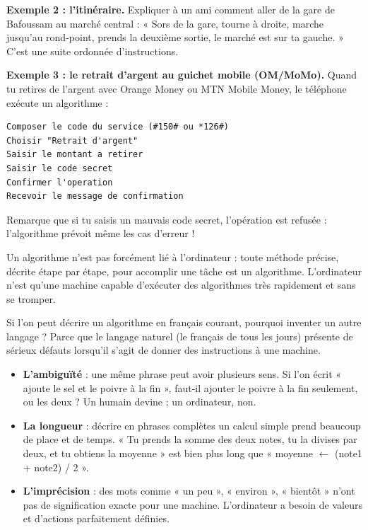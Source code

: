 \documentclass[11pt]{article}
\newcounter{popsec}
\newcounter{popsub}
\newcommand{\courssub}[1]{%
  \stepcounter{popsub}%
  \par\vspace{9pt}\noindent{\popxbold\fontsize{11.5}{13}\selectfont\color{popink}{\color{poporange}\thepopsec.\thepopsub}\hspace{6pt}#1}\par\nopagebreak\vspace{4pt}
}
\begin{document}
\textbf{Exemple 2 : l'itinéraire.} Expliquer à un ami comment aller de la gare de Bafoussam au marché central : « Sors de la gare, tourne à droite, marche jusqu'au rond-point, prends la deuxième sortie, le marché est sur ta gauche. » C'est une suite ordonnée d'instructions.

\textbf{Exemple 3 : le retrait d'argent au guichet mobile (OM/MoMo).} Quand tu retires de l'argent avec Orange Money ou MTN Mobile Money, le téléphone exécute un algorithme :

\begin{lstlisting}
Composer le code du service (#150# ou *126#)
Choisir "Retrait d'argent"
Saisir le montant a retirer
Saisir le code secret
Confirmer l'operation
Recevoir le message de confirmation
\end{lstlisting}

Remarque que si tu saisis un mauvais code secret, l'opération est refusée : l'algorithme prévoit même les cas d'erreur !

\begin{aretenir}[L'essentiel]
Un algorithme n'est pas forcément lié à l'ordinateur : toute méthode précise, décrite étape par étape, pour accomplir une tâche est un algorithme. L'ordinateur n'est qu'une machine capable d'exécuter des algorithmes très rapidement et sans se tromper.
\end{aretenir}

\courssub{Les limites du langage naturel}

Si l'on peut décrire un algorithme en français courant, pourquoi inventer un autre langage ? Parce que le langage naturel (le français de tous les jours) présente de sérieux défauts lorsqu'il s'agit de donner des instructions à une machine.

\begin{itemize}
\item \textbf{L'ambiguïté} : une même phrase peut avoir plusieurs sens. Si l'on écrit « ajoute le sel et le poivre à la fin », faut-il ajouter le poivre à la fin seulement, ou les deux ? Un humain devine ; un ordinateur, non.
\item \textbf{La longueur} : décrire en phrases complètes un calcul simple prend beaucoup de place et de temps. « Tu prends la somme des deux notes, tu la divises par deux, et tu obtiens la moyenne » est bien plus long que « moyenne $\leftarrow$ (note1 + note2) / 2 ».
\item \textbf{L'imprécision} : des mots comme « un peu », « environ », « bientôt » n'ont pas de signification exacte pour une machine. L'ordinateur a besoin de valeurs et d'actions parfaitement définies.
\end{itemize}
\end{document}
